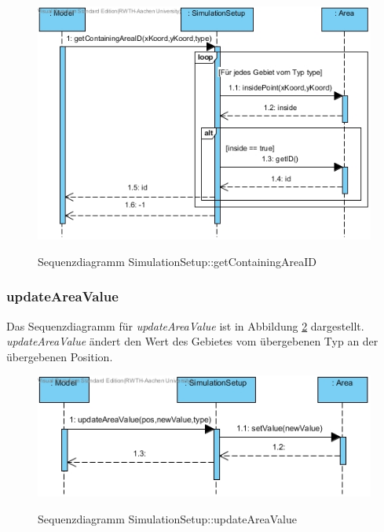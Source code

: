 \begin{figure}[H]
	\centering
	\includegraphics[scale=1]{Bilder/SimulationSetup__getContainingAreaID().jpg}\\
	\caption{Sequenzdiagramm SimulationSetup::getContainingAreaID}
	\label{Sequenzdiagramm SimulationSetup::getContainingAreaID}
\end{figure}

\subsubsection*{updateAreaValue}

Das Sequenzdiagramm für \emph{updateAreaValue} ist in Abbildung \ref{Sequenzdiagramm SimulationSetup::updateAreaValue} dargestellt. \emph{updateAreaValue} ändert den Wert des Gebietes vom übergebenen Typ an der übergebenen Position.

\begin{figure}[H]
	\centering
	\includegraphics[scale=1]{Bilder/SimulationSetup__updateAreaValue().jpg}\\
	\caption{Sequenzdiagramm SimulationSetup::updateAreaValue}
	\label{Sequenzdiagramm SimulationSetup::updateAreaValue}
\end{figure}

